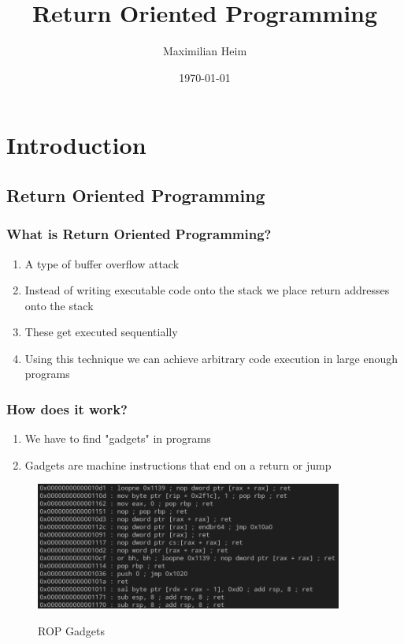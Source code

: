 \documentclass[11pt]{beamer}
\author{Maximilian Heim}
\title{Return Oriented Programming}
\institute{University Albstadt-Sigmaringen}
\date{\today}
\begin{document}
\begin{frame}
\titlepage
\end{frame}

\begin{frame}
\tableofcontents
\end{frame}

\section{Introduction}
\subsection{Return Oriented Programming}
\begin{frame}
    \frametitle{What is Return Oriented Programming?}
    \begin{enumerate}
    \item A type of buffer overflow attack
    \item Instead of writing executable code onto the stack we place return addresses onto the stack
    \item These get executed sequentially
    \item Using this technique we can achieve arbitrary code execution in large enough programs
    \end{enumerate}
\end{frame}

\begin{frame}
    \frametitle{How does it work?}
    \begin{enumerate}
        \item We have to find "gadgets" in programs
        \item Gadgets are machine instructions that end on a return or jump
    \end{enumerate}
    \begin{figure}[h]
        \caption{ROP Gadgets}
        \centering
        \includegraphics[width=0.9\textwidth]{gadget.png}\label{gadget}
    \end{figure}
\end{frame}
\end{document}
